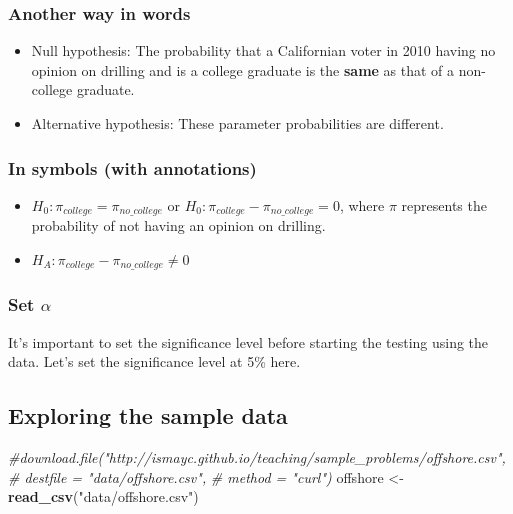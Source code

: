 \documentclass[]{tufte-book}
\newenvironment{Shaded}{\begin{snugshade}}{\end{snugshade}}
\newcommand{\KeywordTok}[1]{\textcolor[rgb]{0.13,0.29,0.53}{\textbf{{#1}}}}
\newcommand{\StringTok}[1]{\textcolor[rgb]{0.31,0.60,0.02}{{#1}}}
\newcommand{\CommentTok}[1]{\textcolor[rgb]{0.56,0.35,0.01}{\textit{{#1}}}}
\newcommand{\NormalTok}[1]{{#1}}
\providecommand{\tightlist}{%
  \setlength{\itemsep}{0pt}\setlength{\parskip}{0pt}}
\theoremstyle{definition}
\theoremstyle{definition}
\theoremstyle{remark}
\begin{document}
\subsubsection{Another way in words}\label{another-way-in-words}

\begin{itemize}
\item
  Null hypothesis: The probability that a Californian voter in 2010
  having no opinion on drilling and is a college graduate is the
  \textbf{same} as that of a non-college graduate.
\item
  Alternative hypothesis: These parameter probabilities are different.
\end{itemize}

\subsubsection{In symbols (with
annotations)}\label{in-symbols-with-annotations-2}

\begin{itemize}
\tightlist
\item
  \(H_0: \pi_{college} = \pi_{no\_college}\) or
  \(H_0: \pi_{college} - \pi_{no\_college} = 0\), where \(\pi\)
  represents the probability of not having an opinion on drilling.
\item
  \(H_A: \pi_{college} - \pi_{no\_college} \ne 0\)
\end{itemize}

\subsubsection{\texorpdfstring{Set
\(\alpha\)}{Set \textbackslash{}alpha}}\label{set-alpha-2}

It's important to set the significance level before starting the testing
using the data. Let's set the significance level at 5\% here.

\subsection{Exploring the sample
data}\label{exploring-the-sample-data-2}

\begin{Shaded}
\begin{Highlighting}[]
\CommentTok{#download.file("http://ismayc.github.io/teaching/sample_problems/offshore.csv",}
\CommentTok{#              destfile = "data/offshore.csv", }
\CommentTok{#              method = "curl")}
\NormalTok{offshore <-}\StringTok{ }\KeywordTok{read_csv}\NormalTok{(}\StringTok{"data/offshore.csv"}\NormalTok{)}
\end{Highlighting}
\end{Shaded}
\end{document}
